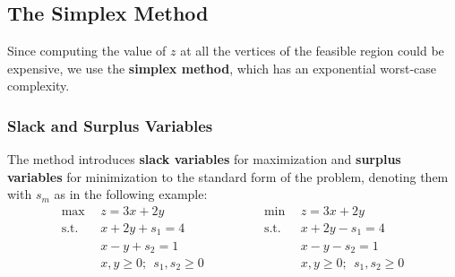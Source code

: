 \documentclass{article}
\begin{document}
\subsection{The Simplex Method}
Since computing the value of $z$ at all the vertices of the feasible region could be expensive, we use the \textbf{simplex method}, which has an exponential worst-case complexity.
\newpage
\subsubsection{Slack and Surplus Variables}
The method introduces \textbf{slack variables} for maximization and \textbf{surplus variables} for minimization to the standard form of the problem, denoting them with $s_m$ as in the following example:
\begin{equation*}
  \begin{split}
  	\max~~ & z = 3x+2y \\
	\text{s.t.}~~ & x+2y+s_1 = 4 \\
	~~& x-y+s_2 = 1 \\
	~~& x,y \geq 0; \ ~ s_1, s_2 \geq 0
  \end{split}
\quad\quad\quad\quad
  \begin{split}
    \min~~ & z = 3x+2y \\
	\text{s.t.}~~ & x+2y-s_1 = 4 \\
	~~& x-y-s_2 = 1 \\
	~~& x,y \geq 0;~ \ s_1, s_2 \geq 0
  \end{split}
\end{equation*}
\end{document}
